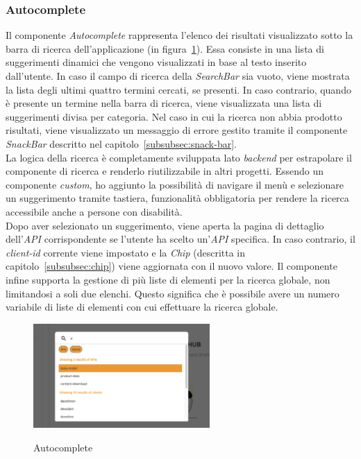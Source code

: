 \subsubsection{Autocomplete}\label{subsubsec:autocomplete}
Il componente \textit{Autocomplete} rappresenta l'elenco dei risultati visualizzato sotto la barra di ricerca dell'applicazione (in figura~\ref{fig:autocomplete}).
Essa consiste in una lista di suggerimenti dinamici che vengono visualizzati in base al testo inserito dall'utente. 
In caso il campo di ricerca della \textit{SearchBar} sia vuoto, viene mostrata la lista degli ultimi quattro termini cercati, se presenti.
In caso contrario, quando è presente un termine nella barra di ricerca, viene visualizzata una lista di suggerimenti divisa per categoria.
Nel caso in cui la ricerca non abbia prodotto risultati, viene visualizzato un messaggio di errore gestito tramite il componente \textit{SnackBar} descritto nel capitolo~\ref{subsubsec:snack-bar}.\\
La logica della ricerca è completamente sviluppata lato \textit{backend} per estrapolare il componente di ricerca e renderlo riutilizzabile in altri progetti.
Essendo un componente \textit{custom}, ho aggiunto la possibilità di navigare il menù e selezionare un suggerimento tramite tastiera, funzionalità 
obbligatoria per rendere la ricerca accessibile anche a persone con disabilità.\\
Dopo aver selezionato un suggerimento, viene aperta la pagina di dettaglio dell'\textit{API} corrispondente se l'utente ha scelto un'\textit{API} specifica.  In caso contrario, il \textit{client-id} corrente viene impostato e la \textit{Chip} (descritta in capitolo~\ref{subsubsec:chip}) viene aggiornata con il nuovo valore.
Il componente infine supporta la gestione di più liste di elementi per la ricerca globale, non limitandosi a soli due elenchi. Questo significa che è possibile avere un numero variabile di liste di elementi con cui effettuare la ricerca globale. 

\begin{figure}[ht]
  \centering
  \includegraphics[width=0.6\textwidth, alt={Componente che si occupa della lista dinamica di risultati}]{images/frontend/SearchBar2.jpg}
  \caption{Autocomplete}\label{fig:autocomplete}
\end{figure}
\pagebreak
